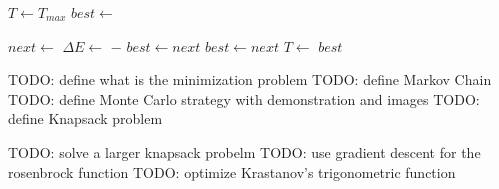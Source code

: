 \documentclass[10pt]{extarticle}
\begin{document}
\begin{algorithmic}
\State $T\gets T_{max}$
\State $best\gets$ \textbf{}

	\State $next\gets $ \textbf{}
	\State $\Delta E\gets$ \textbf{} $-$ \textbf{}
      \State $best\gets next$
		\State $best\gets next$
	\EndIf
	\State $T\gets$ \textbf{}
\EndWhile
\Return $best$
\EndFunction
\end{algorithmic}

TODO: define what is the minimization problem
TODO: define Markov Chain
TODO: define Monte Carlo strategy with demonstration and images
TODO: define Knapsack problem

TODO: solve a larger knapsack probelm
TODO: use gradient descent for the rosenbrock function
TODO: optimize Krastanov's trigonometric function
\end{document}
